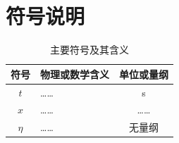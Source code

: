 \section{符号说明}

\begin{table}[htbp]
  \centering
  \caption{主要符号及其含义}
  \label{tab:symbols}
  \begin{tabularx}{\textwidth}{C L C}
    \toprule
    \textbf{符号} & \textbf{物理或数学含义} & \textbf{单位或量纲} \\
    \midrule
    $t$ & …… & \si{\second} \\
    $x$ & …… & …… \\
    $\eta$ & …… & 无量纲 \\
    \bottomrule
  \end{tabularx}
\end{table}
